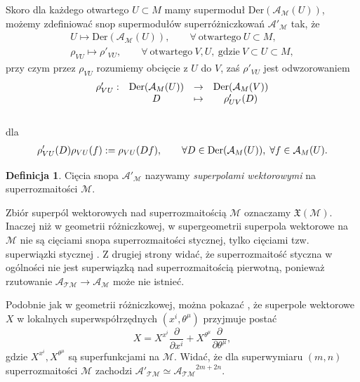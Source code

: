 \documentclass[11pt,a4paper]{report}
\theoremstyle{definition}
\newtheorem{definition}[theorem]{Definicja}
\begin{document}
Skoro dla każdego otwartego $U \subset M$ mamy supermoduł $\mathrm{Der}(\mathcal{A}_\mathcal{M}(U))$, możemy zdefiniować snop supermodułów superróżniczkowań $\mathcal{A'}_{\mathcal{M}}$ tak, że
\begin{equation}
	\begin{gathered}
		U \mapsto \mathrm{Der}(\mathcal{A}_\mathcal{M}(U)), \qquad \forall \ \mathrm{otwartego}\ U \subset M, \\
		\rho_{VU} \mapsto \rho'_{VU}, \qquad \forall \ \mathrm{otwartego}\ V, U, \ \mathrm{gdzie\ } V \subset U \subset M,
	\end{gathered}
\end{equation}
przy czym przez $\rho_{VU}$ rozumiemy obcięcie z $U$ do $V$, zaś $\rho'_{VU}$ jest odwzorowaniem
\begin{equation}
	\begin{array}{rccc}
		\rho'_{VU}: & {\rm Der}(\mathcal{A}_M(U)) & \rightarrow & {\rm Der}(\mathcal{A}_M(V)) \\
		            & D                           & \mapsto     & \rho'_{UV}(D)               
	\end{array}
\end{equation} \\[-13pt]
dla
\begin{equation*}
	\begin{aligned}
		\rho'_{VU}(D) \rho_{VU}(f) := \rho_{VU}(Df),                                      
		\qquad \forall D\in {\rm Der}(\mathcal{A}_M(U)),\; \forall f\in \mathcal{A}_M(U). 
	\end{aligned}
\end{equation*}
		      			
\begin{definition}
	Cięcia snopa $\mathcal{A'_{M}}$ nazywamy \textit{superpolami wektorowymi} na superrozmaitości $\mathcal{M}$. 
\end{definition}
		      			
Zbiór superpól wektorowych nad superrozmaitością $\mathcal M$ oznaczamy $\mathfrak{X}(\mathcal{M})$. Inaczej niż w geometrii różniczkowej, w supergeometrii superpola wektorowe na $\mathcal{M}$ nie są cięciami snopa superrozmaitości stycznej, tylko cięciami tzw. superwiązki stycznej \cite{carinena}. Z drugiej strony widać, że superrozmaitość styczna w ogólności nie jest superwiązką nad superrozmaitością pierwotną, ponieważ rzutowanie $\mathcal{A_{TM}} \rightarrow \mathcal{A_M}$ może nie istnieć.
		      			
Podobnie jak w geometrii różniczkowej, można pokazać \cite{rogers}, że superpole wektorowe $X$ w lokalnych superwspółrzędnych $(x^i, \theta^\mu)$ przyjmuje postać \\[-5pt]
\begin{equation*}
	X = X^{x^i} \frac{\partial}{\partial x^i} + X^{\theta^\mu} \frac{\partial}{\partial \theta^\mu},
\end{equation*}
gdzie $X^{x^i}, X^{\theta^\mu}$ są superfunkcjami na $\mathcal{M}$. Widać, że dla superwymiaru $(m,n)$ superrozmaitości $\mathcal{M}$ zachodzi $\mathcal{A'_{TM}} \simeq \mathcal{A_{TM}}^{2m+2n}$.
		      			
\end{document}
